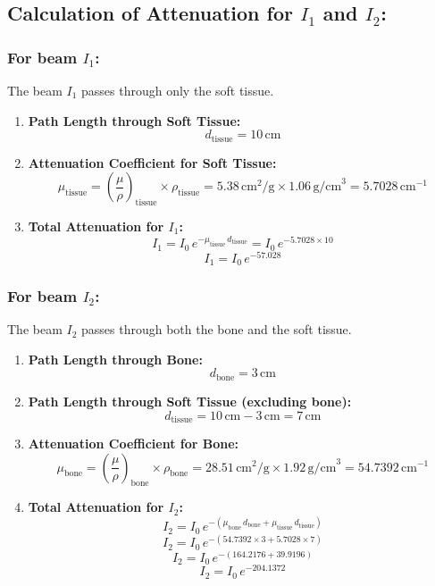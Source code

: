 \documentclass[12pt]{article}
\begin{document}
\subsection*{Calculation of Attenuation for $I_1$ and $I_2$:}

\subsubsection*{For beam $I_1$:}
The beam $I_1$ passes through only the soft tissue.

\begin{enumerate}
    \item \textbf{Path Length through Soft Tissue:}
    \[
    d_{\text{tissue}} = 10 \, \text{cm}
    \]

    \item \textbf{Attenuation Coefficient for Soft Tissue:}
    \[
    \mu_{\text{tissue}} = \left(\frac{\mu}{\rho}\right)_{\text{tissue}} \times \rho_{\text{tissue}} = 5.38 \, \text{cm}^2/\text{g} \times 1.06 \, \text{g/cm}^3 = 5.7028 \, \text{cm}^{-1}
    \]

    \item \textbf{Total Attenuation for $I_1$:}
    \[
    I_1 = I_0 \, e^{-\mu_{\text{tissue}} \, d_{\text{tissue}}} = I_0 \, e^{-5.7028 \times 10}
    \]
    \[
    I_1 = I_0 \, e^{-57.028}
    \]
\end{enumerate}

\subsubsection*{For beam $I_2$:}
The beam $I_2$ passes through both the bone and the soft tissue.

\begin{enumerate}
    \item \textbf{Path Length through Bone:}
    \[
    d_{\text{bone}} = 3 \, \text{cm}
    \]

    \item \textbf{Path Length through Soft Tissue (excluding bone):}
    \[
    d_{\text{tissue}} = 10 \, \text{cm} - 3 \, \text{cm} = 7 \, \text{cm}
    \]

    \item \textbf{Attenuation Coefficient for Bone:}
    \[
    \mu_{\text{bone}} = \left(\frac{\mu}{\rho}\right)_{\text{bone}} \times \rho_{\text{bone}} = 28.51 \, \text{cm}^2/\text{g} \times 1.92 \, \text{g/cm}^3 = 54.7392 \, \text{cm}^{-1}
    \]

    \item \textbf{Total Attenuation for $I_2$:}
    \[
    I_2 = I_0 \, e^{-(\mu_{\text{bone}} \, d_{\text{bone}} + \mu_{\text{tissue}} \, d_{\text{tissue}})}
    \]
    \[
    I_2 = I_0 \, e^{-(54.7392 \times 3 + 5.7028 \times 7)}
    \]
    \[
    I_2 = I_0 \, e^{-(164.2176 + 39.9196)}
    \]
    \[
    I_2 = I_0 \, e^{-204.1372}
    \]
\end{enumerate}
\end{document}
